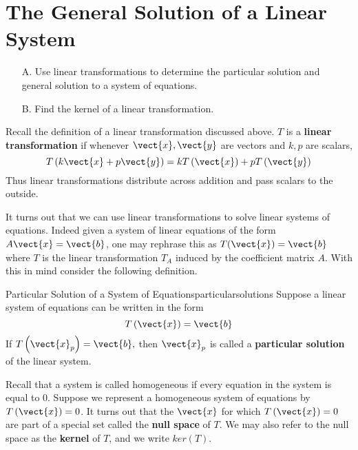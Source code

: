 \section{The General Solution of a Linear System}

\begin{outcome}
\begin{enumerate}
\item[A.]  Use linear transformations to determine the particular solution and general solution to a system of equations.

\item[B.]  Find the kernel of a linear transformation. 
\end{enumerate}
\end{outcome}

Recall the definition of a linear transformation discussed above. 
$T$ is a \textbf{linear transformation} if whenever $\vect{x}, \vect{y}$ are
vectors and $k,p$ are scalars,
\begin{equation*}
T\left( k\vect{x}+p\vect{y}\right) =k T \left( \vect{x} \right) +p T\left(\vect{y} \right)
\end{equation*}
Thus linear transformations distribute across addition and pass scalars to
the outside.

It turns out that we can use linear transformations to solve linear
systems of equations. Indeed given a system of linear equations of the
form $A\vect{x}=\vect{b}$, one may rephrase this as $T(\vect{x})=\vect{b}$ where $T$ is the linear
transformation $T_A$ induced by the coefficient matrix $A$. With this in mind consider the following definition. 

\begin{definition}{Particular Solution of a System of Equations}{particularsolutions}
Suppose a linear system of equations can be written in the form
\begin{equation*}
T\left(\vect{x}\right)=\vect{b}
\end{equation*}
If $T\left(\vect{x}_{p}\right)=\vect{b},$ 
then $\vect{x}_{p}$ is called a \textbf{particular solution} of
the linear system.
\end{definition}

Recall that a system is called homogeneous if every equation in the system is equal to $0$. 
Suppose we represent a homogeneous system of equations by $T\left(\vect{x}\right)=0$. It turns out
that the $\vect{x}$ for which $T \left(\vect{x}\right) = 0$ are part of a special set called the \textbf{null space}
of $T$. We may also refer to the null space as the \textbf{kernel} of $T$, and we write $ker\left(T\right)$. 


